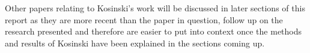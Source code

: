 Other papers relating to Kosinski's work will be discussed in later sections of this report as they are more recent than the paper in question, follow up on the research presented and therefore are easier to put into context once the methods and results of Kosinski have been explained in the sections coming up.